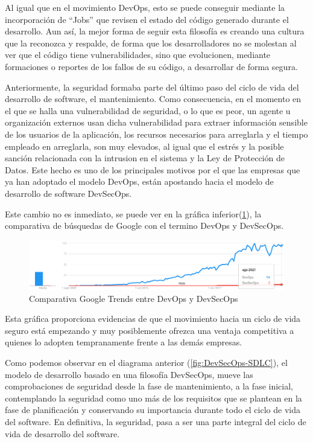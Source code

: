 \documentclass[12pt]{report} %
\begin{document}
Al igual que en el movimiento DevOps, esto se puede conseguir mediante la
incorporación de ``Jobs'' que revisen el estado del código generado durante el
desarrollo.  Aun así, la mejor forma de seguir esta filosofía es creando una
cultura que la reconozca y respalde, de forma que los desarrolladores no se
molestan al ver que el código tiene vulnerabilidades, sino que evolucionen,
mediante formaciones o reportes de los fallos de su código, a desarrollar de
forma segura.

Anteriormente, la seguridad formaba parte del último paso del ciclo de vida del
desarrollo de software, el mantenimiento.  Como consecuencia, en el momento en
el que se halla una vulnerabilidad de seguridad, o lo que es peor, un agente u
organización externos usan dicha vulnerabilidad para extraer información
sensible de los usuarios de la aplicación, los recursos necesarios para
arreglarla y el tiempo empleado en arreglarla, son muy elevados, al igual que el
estrés y la posible sanción relacionada con la intrusion en el sistema y la Ley
de Protección de Datos.  Este hecho es uno de los principales motivos por el que
las empresas que ya han adoptado el modelo DevOps, están apostando hacia el
modelo de desarrollo de software \gls{DevSecOps}.

Este cambio no es inmediato, se puede ver en la gráfica
inferior(\ref{fig:DevOps-DevSecOps-GTrends}), la comparativa
de búsquedas de Google con el termino \gls{DevOps} y \gls{DevSecOps}.

\begin{figure}[H]
  \includegraphics[width=\textwidth]{DevOps-DevSecOps-GTrends} 
  \caption{Comparativa Google Trends entre DevOps y DevSecOps}
  \label{fig:DevOps-DevSecOps-GTrends}
\end{figure}

Esta gráfica proporciona evidencias de que el movimiento hacia un ciclo de vida
seguro está empezando y muy posiblemente ofrezca una ventaja competitiva a
quienes lo adopten tempranamente frente a las demás empresas.

Como podemos observar en el diagrama anterior (\ref{fig:DevSecOps-SDLC}), el modelo
de desarrollo basado en una filosofía DevSecOps, mueve las comprobaciones de
seguridad desde la fase de mantenimiento, a la fase inicial, contemplando la
seguridad como uno más de los requisitos que se plantean en la fase de
planificación y conservando su importancia durante todo el ciclo de vida del
software.
En definitiva, la seguridad, pasa a ser una parte integral del ciclo
de vida de desarrollo del software. 
\end{document}
